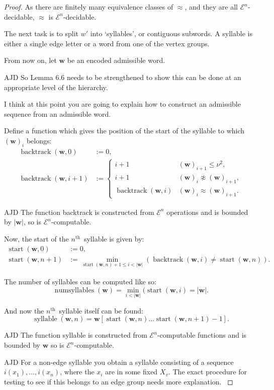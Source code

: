 \documentclass[a4paper]{article}
\newcommand{\grz}[1]{$\mathcal{E}^{#1}$}	%
\newcommand{\nth}{$n^{\textrm{th}}$~}	%
\newcommand{\wvec}{\mathbf{w}}	%
\newcommand{\recur}[1]{\begin{equation} \begin{split} #1 \end{split} \end{equation}}	%
\theoremstyle{plain}
\theoremstyle{definition}
\newenvironment{ad}{\noindent\color{green} AJD }{}
\newcommand{\ajd}[1]{
\begin{ad} #1 \end{ad}}
\begin{document}
\begin{proof}
As there are finitely many equivalence classes of $\approx$, and they are all \grz{n}-decidable, $\approx$ is \grz{n}-decidable.

The next task is to split $w'$ into `syllables', or contiguous subwords. A syllable is either a single edge letter or a word from one of the vertex groups.

From now on, let $\wvec$ be an encoded admissible word.
\ajd{So Lemma 6.6 needs to be strengthened to show this can be done at 
an appropriate level of the hierarchy.

I think at this point you are going to explain how to construct an
admissible sequence from an admissible word. 
}

Define a function which gives the position of the start of the syllable to which $(\wvec)_i$ belongs:
\recur{
	\operatorname{backtrack}(\wvec,0) &:= 0, \\
	\operatorname{backtrack}(\wvec,i+1) &:= \begin{cases}
																					i+1	&	(\wvec)_{i+1} \leq \nu^2, \\
																					i+1	&	(\wvec)_i \not \approx (\wvec)_{i+1}, \\
																					\operatorname{backtrack}(\wvec,i)	&	(\wvec)_i \approx (\wvec)_{i+1}.
																				\end{cases}
}

\ajd{The function }
backtrack is constructed from \grz{n} operations and is bounded by $|\wvec|$, so is \grz{n}-computable.

Now, the start of the \nth syllable is given by:
\recur{
\operatorname{start}(\wvec,0) &:= 0, \\
\operatorname{start}(\wvec,n+1) &:= \min_{\operatorname{start}(\wvec,n)+1 \leq i < |\wvec|} (\operatorname{backtrack}(\wvec,i) \neq \operatorname{start}(\wvec,n)).
}

The number of syllables can be computed like so:
\begin{equation} \operatorname{numsyllables}(\wvec) = \min_{i < |\wvec|} ( \operatorname{start}(\wvec,i) = |\wvec|. \end{equation}

And now the \nth syllable itself can be found:
\begin{equation} \operatorname{syllable}(\wvec,n) = \wvec[\operatorname{start}(\wvec,n) \dots \operatorname{start}(\wvec,n+1)-1]. \end{equation}

\ajd{The function} 
syllable is constructed from \grz{n}-computable functions and is bounded by $\wvec$ so is \grz{n}-computable.
\ajd{For a non-edge syllable you obtain a syllable consisting of a 
 sequence $i(x_1), \ldots ,i(x_n)$, 
where the $x_i$ are in some fixed $X_v$. The exact procedure for testing to see if 
this 
belongs to an edge group needs more explanation.} 


\end{proof}
\end{document}
